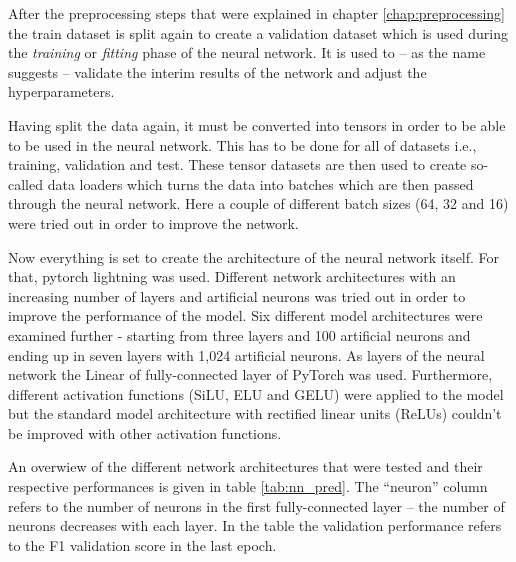 After the preprocessing steps that were explained in chapter \ref{chap:preprocessing} the train dataset is split again to create a validation dataset which is used during the \textit{training} or \textit{fitting} phase of the neural network. It is used to -- as the name suggests -- validate the interim results of the network and adjust the hyperparameters. \citep[][p. 184]{TanPang-Ning2006}

Having split the data again, it must be converted into tensors in order to be able to be used in the neural network. This has to be done for all of datasets i.e., training, validation and test. These tensor datasets are then used to create so-called data loaders which turns the data into batches which are then passed through the neural network. Here a couple of different batch sizes (64, 32 and 16) were tried out in order to improve the network.

Now everything is set to create the architecture of the neural network itself. For that, pytorch lightning was used. Different network architectures with an increasing number of layers and artificial neurons was tried out in order to improve the performance of the model. Six different model architectures were examined further - starting from three layers and 100 artificial neurons and ending up in seven layers with 1,024 artificial neurons. As layers of the neural network the Linear of fully-connected layer of PyTorch was used. \citep{PyTorch2019, PyTorch2021} Furthermore, different activation functions (SiLU, ELU and GELU) were applied to the model but the standard model architecture with rectified linear units (ReLUs) couldn't be improved with other activation functions.

An overwiew of the different network architectures that were tested and their respective performances is given in table \ref{tab:nn_pred}. The \enquote{neuron} column refers to the number of neurons in the first fully-connected layer -- the number of neurons decreases with each layer. In the table the validation performance refers to the F1 validation score in the last epoch.